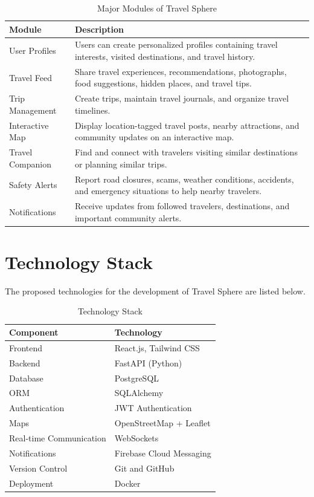 \documentclass[12pt,a4paper]{article}
\begin{document}
\begin{table}[H]
\centering
\renewcommand{\arraystretch}{1.25}
\begin{tabular}{|p{4cm}|p{10.5cm}|}
\hline
\textbf{Module} & \textbf{Description} \\ \hline
User Profiles & Users can create personalized profiles containing travel interests, visited destinations, and travel history. \\ \hline
Travel Feed & Share travel experiences, recommendations, photographs, food suggestions, hidden places, and travel tips. \\ \hline
Trip Management & Create trips, maintain travel journals, and organize travel timelines. \\ \hline
Interactive Map & Display location-tagged travel posts, nearby attractions, and community updates on an interactive map. \\ \hline
Travel Companion & Find and connect with travelers visiting similar destinations or planning similar trips. \\ \hline
Safety Alerts & Report road closures, scams, weather conditions, accidents, and emergency situations to help nearby travelers. \\ \hline
Notifications & Receive updates from followed travelers, destinations, and important community alerts. \\ \hline
\end{tabular}
\caption{Major Modules of Travel Sphere}
\end{table}

\section{Technology Stack}
The proposed technologies for the development of Travel Sphere are listed below.

\begin{table}[H]
\centering
\renewcommand{\arraystretch}{1.2}
\begin{tabular}{|p{5.5cm}|p{8.5cm}|}
\hline
\textbf{Component} & \textbf{Technology} \\ \hline
Frontend & React.js, Tailwind CSS \\ \hline
Backend & FastAPI (Python) \\ \hline
Database & PostgreSQL \\ \hline
ORM & SQLAlchemy \\ \hline
Authentication & JWT Authentication \\ \hline
Maps & OpenStreetMap + Leaflet \\ \hline
Real-time Communication & WebSockets \\ \hline
Notifications & Firebase Cloud Messaging \\ \hline
Version Control & Git and GitHub \\ \hline
Deployment & Docker \\ \hline
\end{tabular}
\caption{Technology Stack}
\end{table}
\end{document}
